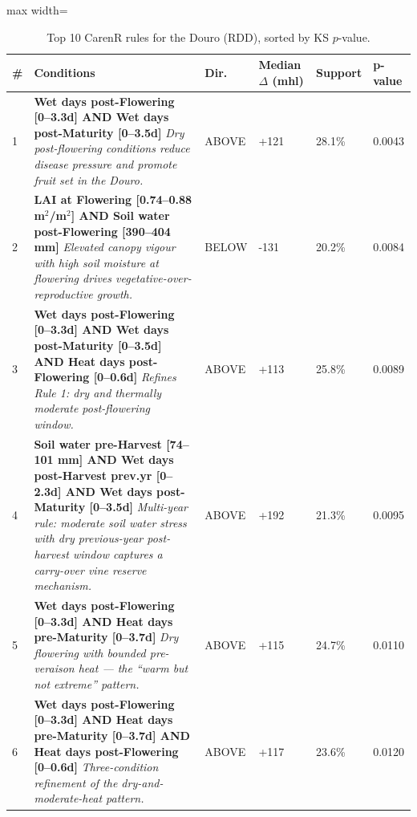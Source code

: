 \begin{table}[htbp]
  \centering
  \caption{Top 10 CarenR rules for the Douro (RDD), sorted by KS $p$-value.}\label{tab:appa_top10_rdd}
  \small
  \begin{adjustbox}{max width=\textwidth}
    \begin{tabularx}{\textwidth}{p{0.4cm}|X|>{\centering\arraybackslash}p{0.9cm}|p{1.3cm}|p{1.2cm}|p{1.2cm}}
  \toprule
  \# & Conditions & Dir. & Median $\Delta$ \newline (mhl) & Support & p-value \\
  \midrule
  1 & \textbf{Wet days post-Flowering [0--3.3d] AND Wet days post-Maturity [0--3.5d]} \newline \textit{Dry post-flowering conditions reduce disease pressure and promote fruit set in the Douro.} & {\footnotesize ABOVE} & +121 & 28.1\% & 0.0043 \\
  2 & \textbf{LAI at Flowering [0.74--0.88 m$^2$/m$^2$] AND Soil water post-Flowering [390--404 mm]} \newline \textit{Elevated canopy vigour with high soil moisture at flowering drives vegetative-over-reproductive growth.} & {\footnotesize BELOW} & -131 & 20.2\% & 0.0084 \\
  3 & \textbf{Wet days post-Flowering [0--3.3d] AND Wet days post-Maturity [0--3.5d] AND Heat days post-Flowering [0--0.6d]} \newline \textit{Refines Rule 1: dry and thermally moderate post-flowering window.} & {\footnotesize ABOVE} & +113 & 25.8\% & 0.0089 \\
  4 & \textbf{Soil water pre-Harvest [74--101 mm] AND Wet days post-Harvest prev.yr [0--2.3d] AND Wet days post-Maturity [0--3.5d]} \newline \textit{Multi-year rule: moderate soil water stress with dry previous-year post-harvest window captures a carry-over vine reserve mechanism.} & {\footnotesize ABOVE} & +192 & 21.3\% & 0.0095 \\
  5 & \textbf{Wet days post-Flowering [0--3.3d] AND Heat days pre-Maturity [0--3.7d]} \newline \textit{Dry flowering with bounded pre-veraison heat — the ``warm but not extreme'' pattern.} & {\footnotesize ABOVE} & +115 & 24.7\% & 0.0110 \\
  6 & \textbf{Wet days post-Flowering [0--3.3d] AND Heat days pre-Maturity [0--3.7d] AND Heat days post-Flowering [0--0.6d]} \newline \textit{Three-condition refinement of the dry-and-moderate-heat pattern.} & {\footnotesize ABOVE} & +117 & 23.6\% & 0.0120 \\

\end{tabularx}
\end{adjustbox}
\end{table}
